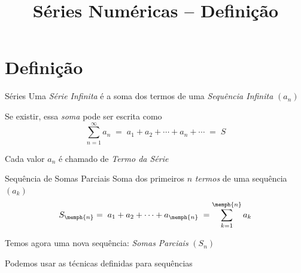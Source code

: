 
\usepackage{integracao_e_series}
\usepackage{cancel}

\title{Séries Numéricas -- Definição}



\addtitle

\section{Definição}

\begin{frame}{Séries}
    Uma \emph{Série Infinita} é a soma dos termos de uma \emph{Sequência Infinita} $(a_n)$

    \pause
    \vspace{\baselineskip}
    Se existir, essa \emph{soma} pode ser escrita como
    \[
      \sum_{n=1}^\infty a_n
      \;=\; a_1 + a_2 + \cdots + a_n + \cdots
      \;=\; S
    \]

    \pause
    Cada valor $a_n$ é chamado de \emph{Termo da Série}

\end{frame}

\begin{frame}{Sequência de Somas Parciais}
    Soma dos primeiros $n$ \emph{termos} de uma sequência $(a_k)$
    \[
      S_{\memph{n}}
      = \; a_1 + a_2 + \cdots + a_{\memph{n}} \;
      = \sum_{k=1}^{\memph{n}} a_k
    \]

    \pause
    Temos agora uma nova sequência: \emph{Somas Parciais} $(S_n)$

    \pause
    \vspace{\baselineskip}
    Podemos usar as técnicas definidas para sequências

\end{frame}

